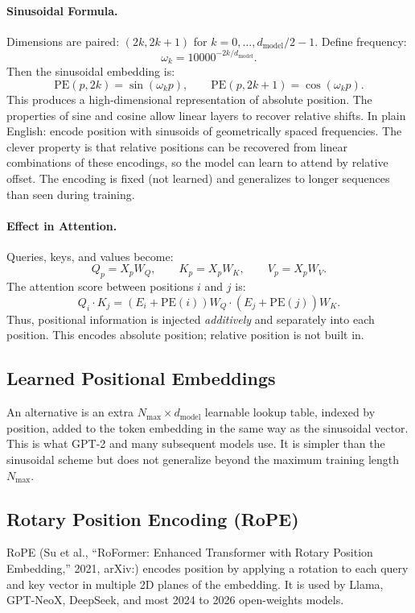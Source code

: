 \documentclass[11pt]{article}
\theoremstyle{remark}
\newcommand{\arxiv}[1]{arXiv:\allowbreak #1}
\begin{document}
\paragraph{Sinusoidal Formula.}
Dimensions are paired: $(2k,2k+1)$ for $k = 0,\dots,d_{\text{model}}/2-1$.
Define frequency:
\[
\omega_k = 10000^{-2k/d_{\text{model}}}.
\]
Then the sinusoidal embedding is:
\[
\text{PE}(p,2k)   = \sin(\omega_k p),
\qquad
\text{PE}(p,2k+1) = \cos(\omega_k p).
\]
This produces a high-dimensional representation of absolute position. The properties of sine and cosine allow linear layers to recover relative shifts. In plain English: encode position with sinusoids of geometrically spaced frequencies. The clever property is that relative positions can be recovered from linear combinations of these encodings, so the model can learn to attend by relative offset. The encoding is fixed (not learned) and generalizes to longer sequences than seen during training.

\paragraph{Effect in Attention.}
Queries, keys, and values become:
\[
Q_p = X_p W_Q,\qquad K_p = X_p W_K,\qquad V_p = X_p W_V.
\]
The attention score between positions $i$ and $j$ is:
\[
Q_i \cdot K_j
= (E_i + \text{PE}(i))W_Q \cdot (E_j + \text{PE}(j))W_K.
\]
Thus, positional information is injected \emph{additively} and separately into each position.
This encodes absolute position; relative position is not built in.

\subsection{Learned Positional Embeddings}

An alternative is an extra \(N_{\max} \times d_{\text{model}}\) learnable lookup table, indexed by position, added to the token embedding in the same way as the sinusoidal vector. This is what GPT-2 and many subsequent models use. It is simpler than the sinusoidal scheme but does not generalize beyond the maximum training length \(N_{\max}\).

\subsection{Rotary Position Encoding (RoPE)}

RoPE (Su et al., ``RoFormer: Enhanced Transformer with Rotary Position Embedding,'' 2021, \arxiv{2104.09864}) encodes position by applying a rotation to each query and key vector in multiple 2D planes of the embedding. It is used by Llama, GPT-NeoX, DeepSeek, and most 2024 to 2026 open-weights models.
\end{document}
